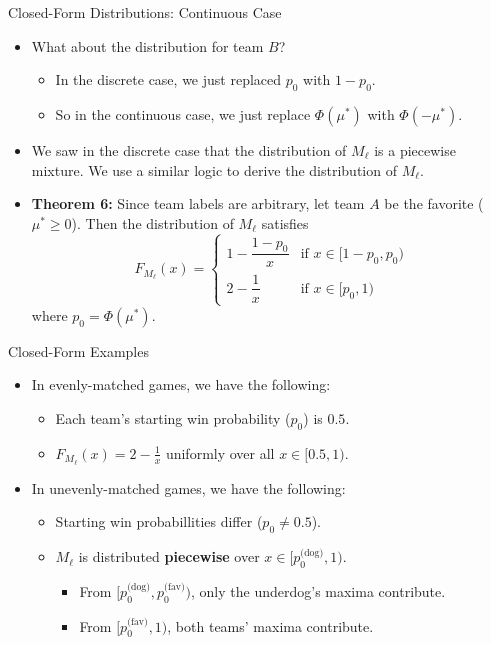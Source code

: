 \documentclass{beamer}
\begin{document}
\begin{frame}{Closed-Form Distributions: Continuous Case}
  \begin{itemize}
    \item What about the distribution for team $B$?
    \pause
    \begin{itemize}
      \item In the discrete case, we just replaced $p_0$ with $1 - p_0$.
      \pause
      \item So in the continuous case, we just replace $\Phi(\mu^*)$ with $\Phi(-\mu^*)$.
    \end{itemize}
    \pause
    \item We saw in the discrete case that the distribution of $M_\ell$ is a piecewise mixture. We use a similar logic to derive the distribution of $M_\ell$.
    \pause
    \item \textbf{Theorem 6:} Since team labels are arbitrary, let team $A$ be the favorite ($\mu^* \geq 0$). Then the distribution of $M_\ell$ satisfies
    \begin{equation*}
      F_{M_\ell}(x) = \begin{cases}
        1 - \dfrac{1-p_0}{x} & \text{if } x \in [1 - p_0, p_0) \\
        2 - \dfrac{1}{x} & \text{if } x \in [p_0, 1)
      \end{cases} 
    \end{equation*}
    where $p_0 = \Phi(\mu^*)$.
  \end{itemize}
\end{frame}

\begin{frame}{Closed-Form Examples}
  \begin{itemize}
    \item In evenly-matched games, we have the following:
    \pause
    \begin{itemize}
      \item Each team's starting win probability ($p_0$) is $0.5$.
      \pause
      \item $F_{M_\ell}(x) = 2 - \frac{1}{x}$ uniformly over all $x \in [0.5, 1)$.
    \end{itemize}
    \pause
    \item In unevenly-matched games, we have the following:
    \pause
    \begin{itemize}
      \item Starting win probabillities differ ($p_0 \neq 0.5$).
      \pause
      \item $M_\ell$ is distributed \textbf{piecewise} over $x \in [p_0^\text{(dog)}, 1)$.
      \pause
      \begin{itemize}
        \item From $[p_0^\text{(dog)}, p_0^\text{(fav)})$, only the underdog's maxima contribute.
        \pause
        \item From $[p_0^\text{(fav)}, 1)$, both teams' maxima contribute.
      \end{itemize}
    \end{itemize}
  \end{itemize}
  \end{frame}
\end{document}
